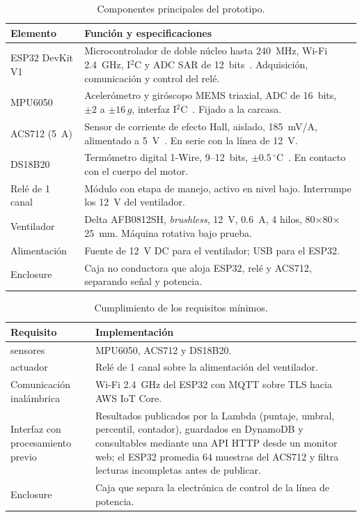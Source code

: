 \documentclass[10pt,twocolumn]{article}
\begin{document}
\begin{table}[htbp]
\centering
\caption{Componentes principales del prototipo.}
\label{tab:componentes}
\scriptsize
\begin{tabularx}{\columnwidth}{@{}>{\raggedright\arraybackslash}p{1.6cm}>{\raggedright\arraybackslash}X@{}}
\toprule
\textbf{Elemento} & \textbf{Función y especificaciones} \\
\midrule
ESP32 DevKit V1 & Microcontrolador de doble núcleo hasta 240~MHz, Wi-Fi 2.4~GHz, I$^2$C y ADC
SAR de 12~bits~\cite{esp32}. Adquisición, comunicación y control del relé. \\
\addlinespace
MPU6050 & Acelerómetro y giróscopo MEMS triaxial, ADC de 16~bits, $\pm2$ a $\pm16\,g$,
interfaz I$^2$C~\cite{mpu6050}. Fijado a la carcasa. \\
\addlinespace
ACS712 (5~A) & Sensor de corriente de efecto Hall, aislado, 185~mV/A, alimentado a
5~V~\cite{acs712}. En serie con la línea de 12~V. \\
\addlinespace
DS18B20 & Termómetro digital 1-Wire, 9--12~bits, $\pm0.5\,^{\circ}$C~\cite{ds18b20}. En contacto
con el cuerpo del motor. \\
\addlinespace
Relé de 1 canal & Módulo con etapa de manejo, activo en nivel bajo. Interrumpe los 12~V del
ventilador. \\
\addlinespace
Ventilador & Delta AFB0812SH, \textit{brushless}, 12~V, 0.6~A, 4 hilos, 80$\times$80$\times$25~mm.
Máquina rotativa bajo prueba. \\
\addlinespace
Alimentación & Fuente de 12~V DC para el ventilador; USB para el ESP32. \\
\addlinespace
Enclosure & Caja no conductora que aloja ESP32, relé y ACS712, separando señal y potencia. \\
\bottomrule
\end{tabularx}
\end{table}

\begin{table}[htbp]
\centering
\caption{Cumplimiento de los requisitos mínimos.}
\label{tab:requisitos}
\scriptsize
\begin{tabularx}{\columnwidth}{@{}>{\raggedright\arraybackslash}p{2.0cm}>{\raggedright\arraybackslash}X@{}}
\toprule
\textbf{Requisito} & \textbf{Implementación} \\
\midrule
3 sensores & MPU6050, ACS712 y DS18B20. \\
1 actuador & Relé de 1 canal sobre la alimentación del ventilador. \\
Comunicación inalámbrica & Wi-Fi 2.4~GHz del ESP32 con MQTT sobre TLS hacia AWS IoT Core. \\
Interfaz con procesamiento previo & Resultados publicados por la Lambda (puntaje, umbral,
percentil, contador), guardados en DynamoDB y consultables mediante una API HTTP desde un
monitor web; el ESP32 promedia 64
muestras del ACS712 y filtra lecturas incompletas antes de publicar. \\
Enclosure & Caja que separa la electrónica de control de la línea de potencia. \\
\bottomrule
\end{tabularx}
\end{table}
\end{document}
